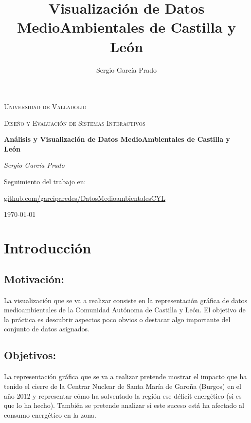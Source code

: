 \documentclass{article}
\title{Visualización de Datos MedioAmbientales de Castilla y León}
\author{Sergio García Prado}
\begin{document}
	\begin{titlepage}
		\centering
		{\scshape\LARGE Universidad de Valladolid \par}
		\vspace{1cm}
		{\scshape\Large Diseño y Evaluación de Sistemas Interactivos\par}
		\vspace{1.5cm}
		{\huge\bfseries Análisis y Visualización de Datos MedioAmbientales de Castilla y León\par}
		\vspace{2cm}
		{\Large\itshape Sergio García Prado\par}

		\vfill
		Seguimiento del trabajo en: \par
		\href{https://github.com/garciparedes/DatosMedioambientalesCYL}{github.com/garciparedes/DatosMedioambientalesCYL}
		\vfill


		{\large \today\par}
	\end{titlepage}



	\newpage
		\tableofcontents
	\newpage


	\section{Introducción}

		\subsection{Motivación:}

			\paragraph{}
			La visualización que se va a realizar consiste en la representación gráfica de datos medioambientales de la Comunidad Autónoma de Castilla y León. El objetivo de la práctica es descubrir aspectos poco obvios o destacar algo importante del conjunto de datos asignados.

		\subsection{Objetivos:}

			\paragraph{}
			La representación gráfica que se va a realizar pretende mostrar el impacto que ha tenido el cierre de la Centrar Nuclear de Santa María de Garoña (Burgos) en el año 2012 y representar cómo ha solventado la región ese déficit energético (si es que lo ha hecho). También se pretende analizar si este suceso está ha afectado al consumo energético en la zona.
\end{document}

